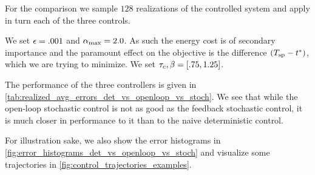 \documentclass{article}
\begin{document}
For the comparison we sample $128$ realizations of the controlled system
and apply in turn each of the three controls.

We set ${\epsilon} = .001$ and ${ {\alpha}_{\textrm{max}} } = 2.0$. As such the energy cost is of
secondary importance and the paramount effect on the objective is the difference
$({ T_{\textrm{sp} } } - { t^* })$, which we are trying to minimize. We set ${ \tau_{c} }, {\beta} = [.75, 1.25]$.

The performance of the three controllers is given in
\cref{tab:realized_avg_errors_det_vs_openloop_vs_stoch}. We see that while the
open-loop stochastic control is not as good as the feedback stochastic
control, it is much closer in performance to it than to the naive
deterministic control.

For illustration sake, we also show the error
histograms in \cref{fig:error_histograms_det_vs_openloop_vs_stoch} and visualize
some trajectories in \cref{fig:control_trajectories_examples}.
\end{document}
